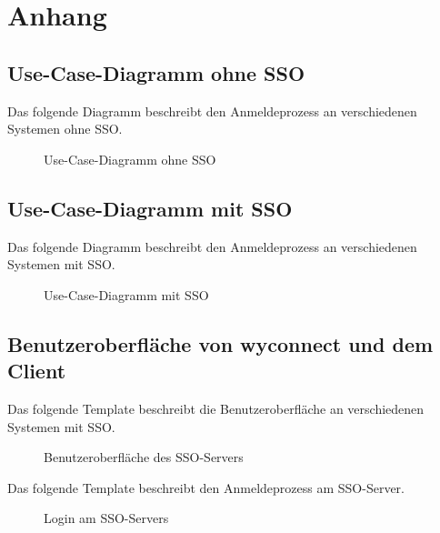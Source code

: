 \section{Anhang}





\clearpage

\subsection{Use-Case-Diagramm ohne SSO}
\label{app:Use-Case-Diagramm}
Das folgende Diagramm beschreibt den Anmeldeprozess an verschiedenen Systemen ohne \acs{SSO}.
\begin{figure}[htb]
\centering
{}
\caption{Use-Case-Diagramm ohne SSO}
\end{figure}
\clearpage

\subsection{Use-Case-Diagramm mit SSO}
\label{app:Use-Case-Diagramm2}
Das folgende Diagramm beschreibt den Anmeldeprozess an verschiedenen Systemen mit \acs{SSO}.
\begin{figure}[htb]
\centering
{}
\caption{Use-Case-Diagramm mit SSO}
\end{figure}
\clearpage

\subsection{Benutzeroberfläche von wyconnect und dem Client}
\label{app:wyconnect-mockup}

Das folgende Template beschreibt die Benutzeroberfläche an verschiedenen Systemen mit \acs{SSO}.
\begin{figure}[htb]
\centering
{}
\caption{Benutzeroberfläche des SSO-Servers}
\end{figure}
\clearpage

Das folgende Template beschreibt den Anmeldeprozess am \acs{SSO}-Server.
\begin{figure}[htb]
\centering
{}
\caption{Login am SSO-Servers}
\end{figure}
\clearpage

